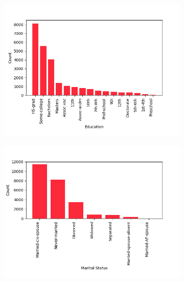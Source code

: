 \documentclass{article}
\begin{document}
\begin{figure}[H]
    \centering
    \begin{subfigure}{0.3\textwidth}
        \includegraphics[width=\linewidth]{img/education.png}
    \end{subfigure}
    \begin{subfigure}{0.3\textwidth}
        \includegraphics[width=\linewidth,]{img/marital-status.png}
    \end{subfigure}
    \begin{subfigure}{0.3\textwidth}

\end{subfigure}
\end{figure}
\end{document}
